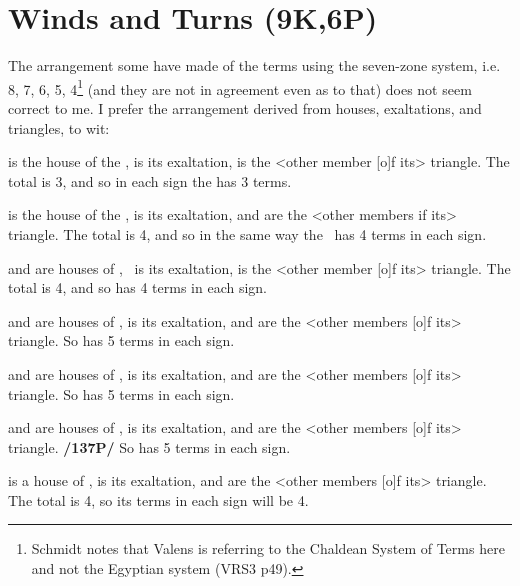 \section{Winds and Turns (9K,6P)}
The arrangement some have made of the terms using the seven-zone system, i.e. 8, 7, 6, 5, 4\footnote{Schmidt notes that Valens is referring to the Chaldean System of Terms here and not the Egyptian system (VRS3 p49).} (and they are not in agreement even as to that) does not seem correct to me. I prefer the arrangement derived from houses, exaltations, and triangles, to wit:

\Leo\xspace is the house of the \Sun, \Aries\xspace is its exaltation, \Sagittarius\xspace is the <other member [o]f its> triangle. The total is 3, and so in each sign the \Sun\xspace has 3 terms.

\Cancer\xspace is the house of the \Moon, \Taurus\xspace is its exaltation, \Virgo\xspace and \Capricorn\xspace are the <other members if its> triangle. The total is 4, and so in the same way the \Moon\, has 4 terms in each sign.

\Capricorn\xspace and \Aquarius\xspace are houses of \Saturn, \Libra\, is its exaltation, \Gemini\xspace is the <other member [o]f its> triangle. The total is 4, and so \Saturn\xspace has 4 terms in each sign.

\Sagittarius\xspace and \Pisces\xspace are houses of \Jupiter, \Cancer\xspace is its exaltation, \Aries\xspace and \Leo\xspace are the <other members [o]f its> triangle. So \Jupiter\xspace has 5 terms in each sign.

\Aries\xspace and \Scorpio\xspace are houses of \Mars, \Capricorn\xspace is its exaltation, \Pisces\xspace and \Cancer\xspace are the <other members [o]f its> triangle. So \Mars\xspace has 5 terms in each sign.

\Taurus\xspace and \Libra\xspace are houses of \Venus, \Pisces\xspace is its exaltation, \Virgo\xspace and \Capricorn\xspace are the <other members [o]f its> triangle. \textbf{/137P/} So \Venus\xspace has 5 terms in each sign.

\Gemini\xspace is a house of \Mercury, \Virgo\xspace is its exaltation, \Aquarius\xspace and \Libra\xspace are the <other members [o]f its> triangle. The total is 4, so its terms in each sign will be 4.
\newpage


